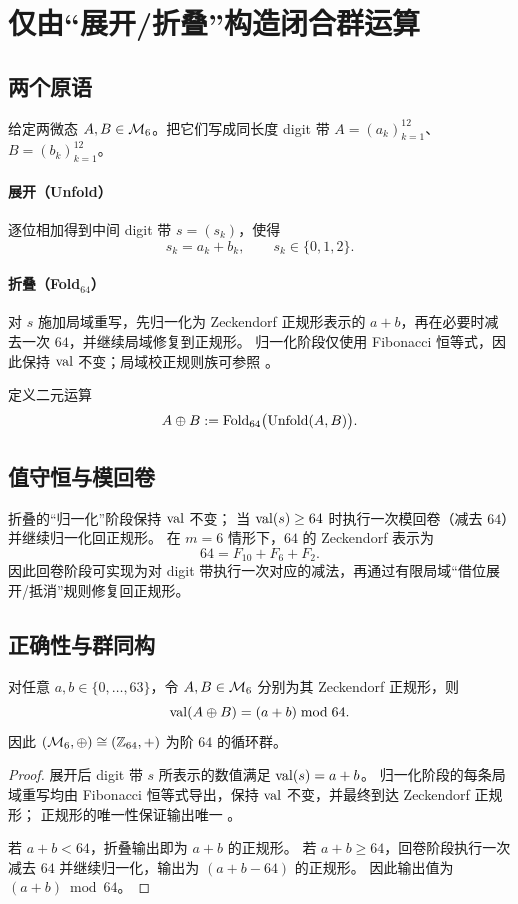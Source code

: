 \section{仅由“展开/折叠”构造闭合群运算}

\subsection{两个原语}

给定两微态 $A,B\in\mathcal{M}_6$。把它们写成同长度 digit 带 $A=(a_k)_{k=1}^{12}$、$B=(b_k)_{k=1}^{12}$。

\paragraph{展开（Unfold）}
逐位相加得到中间 digit 带 $s=(s_k)$，使得
$$
s_k=a_k+b_k,\qquad s_k\in\{0,1,2\}.
$$

\paragraph{折叠（Fold$_{64}$）}
对 $s$ 施加局域重写，先归一化为 Zeckendorf 正规形表示的 $a+b$，再在必要时减去一次 $64$，并继续局域修复到正规形。
归一化阶段仅使用 Fibonacci 恒等式，因此保持 $\mathrm{val}$ 不变；局域校正规则族可参照 \cite{Fenwick2003ZeckendorfArithmetic}。

\begin{definition}[闭合运算]
定义二元运算
$$
A\oplus B:=\mathrm{Fold}_{64}\bigl(\mathrm{Unfold}(A,B)\bigr).
$$
\end{definition}

\subsection{值守恒与模回卷}

折叠的“归一化”阶段保持 $\mathrm{val}$ 不变；
当 $\mathrm{val}(s)\ge 64$ 时执行一次模回卷（减去 $64$）并继续归一化回正规形。
在 $m=6$ 情形下，$64$ 的 Zeckendorf 表示为
$$
64=F_{10}+F_6+F_2.
$$
因此回卷阶段可实现为对 digit 带执行一次对应的减法，再通过有限局域“借位展开/抵消”规则修复回正规形。

\subsection{正确性与群同构}

\begin{theorem}[闭合与群同构]
对任意 $a,b\in\{0,\dots,63\}$，令 $A,B\in\mathcal{M}_6$ 分别为其 Zeckendorf 正规形，则
$$
\mathrm{val}(A\oplus B)=(a+b)\bmod 64.
$$
因此 $(\mathcal{M}_6,\oplus)\cong(\mathbb{Z}_{64},+)$ 为阶 $64$ 的循环群。
\end{theorem}

\begin{proof}
展开后 digit 带 $s$ 所表示的数值满足 $\mathrm{val}(s)=a+b$。
归一化阶段的每条局域重写均由 Fibonacci 恒等式导出，保持 $\mathrm{val}$ 不变，并最终到达 Zeckendorf 正规形；
正规形的唯一性保证输出唯一 \cite{WikipediaZeckendorf}。

若 $a+b<64$，折叠输出即为 $a+b$ 的正规形。
若 $a+b\ge 64$，回卷阶段执行一次减去 $64$ 并继续归一化，输出为 $(a+b-64)$ 的正规形。
因此输出值为 $(a+b)\bmod 64$。
\end{proof}

